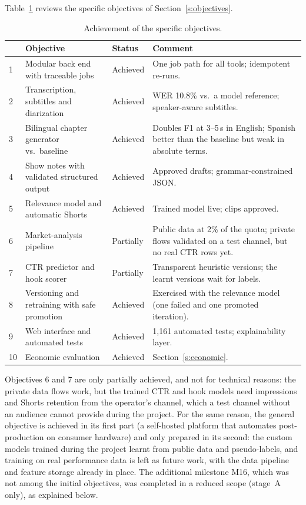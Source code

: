 Table~\ref{tab:objectives} reviews the specific objectives of Section~\ref{s:objectives}.

\begin{table}[H]
\centering
\caption{Achievement of the specific objectives.}
\label{tab:objectives}
\small
\begin{tabular}{@{}p{0.5cm}p{6.2cm}p{1.8cm}p{5.6cm}@{}}
\toprule
& \textbf{Objective} & \textbf{Status} & \textbf{Comment} \\
\midrule
1 & Modular back end with traceable jobs & Achieved & One job path for all tools; idempotent re-runs. \\
2 & Transcription, subtitles and diarization & Achieved & WER 10.8\% vs.\ a model reference; speaker-aware subtitles. \\
3 & Bilingual chapter generator vs.\ baseline & Achieved & Doubles F1 at 3--5\,s in English; Spanish better than the baseline but weak in absolute terms. \\
4 & Show notes with validated structured output & Achieved & Approved drafts; grammar-constrained JSON. \\
5 & Relevance model and automatic Shorts & Achieved & Trained model live; clips approved. \\
6 & Market-analysis pipeline & Partially & Public data at 2\% of the quota; private flows validated on a test channel, but no real CTR rows yet. \\
7 & CTR predictor and hook scorer & Partially & Transparent heuristic versions; the learnt versions wait for labels. \\
8 & Versioning and retraining with safe promotion & Achieved & Exercised with the relevance model (one failed and one promoted iteration). \\
9 & Web interface and automated tests & Achieved & 1{,}161 automated tests; explainability layer. \\
10 & Economic evaluation & Achieved & Section~\ref{s:economic}. \\
\bottomrule
\end{tabular}
\end{table}

Objectives 6 and 7 are only partially achieved, and not for technical reasons: the private data flows work, but the trained CTR and hook models need impressions and Shorts retention from the operator's channel, which a test channel without an audience cannot provide during the project. For the same reason, the general objective is achieved in its first part (a self-hosted platform that automates post-production on consumer hardware) and only prepared in its second: the custom models trained during the project learnt from public data and pseudo-labels, and training on real performance data is left as future work, with the data pipeline and feature storage already in place. The additional milestone M16, which was not among the initial objectives, was completed in a reduced scope (stage~A only), as explained below.

